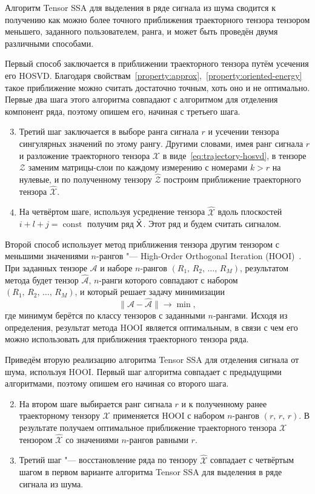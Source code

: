 \documentclass[specialist,
    substylefile = spbu_report.rtx,
    subf,href,colorlinks=true, 12pt]{disser}
\theoremstyle{plain}
\theoremstyle{definition}
\theoremstyle{remark}
\begin{document}
    Алгоритм Tensor SSA для выделения в ряде сигнала из шума сводится к получению
    как можно более точного приближения траекторного тензора тензором меньшего, заданного пользователем, ранга, и
    может быть проведён двумя различными способами.

    Первый способ заключается в приближении траекторного тензора путём усечения его HOSVD\@.
    Благодаря свойствам~\ref{property:approx},~\ref{property:oriented-energy} такое приближение можно считать достаточно точным,
    хоть оно и не оптимально.
    Первые два шага этого алгоритма совпадают с алгоритмом для отделения компонент ряда, поэтому опишем его, начиная с третьего шага.
    \begin{enumerate}
        \setcounter{enumi}{2}
        \item Третий шаг заключается в выборе ранга сигнала $r$ и усечении тензора сингулярных значений по этому рангу.
        Другими словами, имея ранг сигнала $r$ и разложение траекторного тензора $\mathcal{X}$ в виде~\eqref{eq:trajectory-hosvd},
        в тензоре $\mathcal{Z}$ заменим матрицы-слои по каждому измерению с номерами $k>r$ на нулевые, и по полученному тензору $\hat{\mathcal{Z}}$
        построим приближение траекторного тензора $\hat{\mathcal{X}}$.
        \item На четвёртом шаге, используя усреднение тензора $\hat{\mathcal{X}}$ вдоль плоскостей $i+l+j=\operatorname{const}$
        получим ряд $\hat{\mathsf{X}}$.
        Этот ряд и будем считать сигналом.
    \end{enumerate}

    Второй способ использует метод приближения тензора другим тензором с меньшими значениями $n$-рангов "--- High-Order Orthogonal
    Iteration (HOOI)~\cite{hooi}.
    При заданных тензоре $\mathcal{A}$ и наборе $n$-рангов $(R_1,\, R_2,\, \ldots,\, R_M)$, результатом метода будет
    тензор $\hat{\mathcal{A}}$, $n$-ранги которого совпадают с набором $(R_1,\, R_2,\, \ldots,\, R_M)$, и который решает
    задачу минимизации
    \[
        \|\mathcal{A}-\hat{\mathcal{A}}\|\to \min,
    \]
    где минимум берётся по классу тензоров с заданными $n$-рангами.
    Исходя из определения, результат метода HOOI является оптимальным, в связи с чем его можно использовать
    для приближения траекторного тензора ряда.

    Приведём вторую реализацию алгоритма Tensor SSA для отделения сигнала от шума, используя HOOI\@.
    Первый шаг алгоритма совпадает с предыдущими алгоритмами, поэтому опишем его начиная со второго шага.
    \begin{enumerate}
        \setcounter{enumi}{1}
        \item На втором шаге выбирается ранг сигнала $r$ и к полученному ранее траекторному тензору $\mathcal{X}$ применяется
        HOOI с набором $n$-рангов $(r,\, r,\, r)$.
        В результате получаем оптимальное приближение траекторного тензора $\mathcal{X}$ тензором $\hat{\mathcal{X}}$ со
        значениями $n$-рангов равными $r$.
        \item Третий шаг "--- восстановление ряда по тензору $\hat{\mathcal{X}}$ совпадает с четвёртым шагом в первом
        варианте алгоритма Tensor SSA для выделения в ряде сигнала из шума.
    \end{enumerate}
\end{document}
